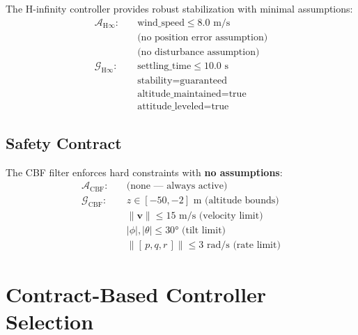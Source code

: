 \begin{contract}
\label{contract:hinf}
The H-infinity controller provides robust stabilization with minimal assumptions:
\begin{align*}
    \mathcal{A}_{\text{H}\infty}: \quad & \text{wind\_speed} \leq 8.0 \text{ m/s} \\
    & \text{(no position error assumption)} \\
    & \text{(no disturbance assumption)} \\[6pt]
    \mathcal{G}_{\text{H}\infty}: \quad & \text{settling\_time} \leq 10.0 \text{ s} \\
    & \text{stability} = \text{guaranteed} \\
    & \text{altitude\_maintained} = \text{true} \\
    & \text{attitude\_leveled} = \text{true}
\end{align*}
\end{contract}


\subsection{Safety Contract}

\begin{contract}
\label{contract:cbf}
The CBF filter enforces hard constraints with \textbf{no assumptions}:
\begin{align*}
    \mathcal{A}_{\text{CBF}}: \quad & \text{(none --- always active)} \\[6pt]
    \mathcal{G}_{\text{CBF}}: \quad & z \in [-50, -2] \text{ m (altitude bounds)} \\
    & \|\mathbf{v}\| \leq 15 \text{ m/s (velocity limit)} \\
    & |\phi|, |\theta| \leq 30° \text{ (tilt limit)} \\
    & \|[\,p, q, r\,]\| \leq 3 \text{ rad/s (rate limit)}
\end{align*}
\end{contract}

\section{Contract-Based Controller Selection}

